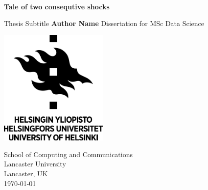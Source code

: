 

\begin{titlepage}
\begin{center}
\vspace*{5cm}
\Huge{\textbf{Tale of two consequtive shocks}}

\vspace*{3cm}
\Large{Thesis Subtitle}
\vfill
\Large{\textbf{Author Name}}
\vfill
Dissertation for MSc Data Science

\vspace{0.8cm}
\includegraphics[width=0.4\textwidth]{university.png}

School of Computing and Communications\\
Lancaster University\\
Lancaster, UK\\
\today
\end{center}
\end{titlepage}


\thispagestyle{empty}

% 
% 


